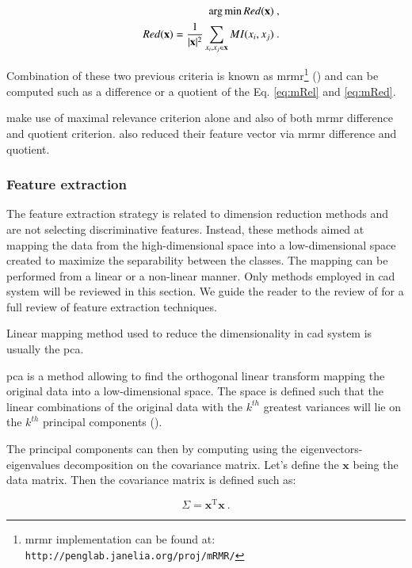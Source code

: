 \begin{eqnarray}
	&&\operatorname*{arg\,min} Red(\mathbf{x}) \ , \nonumber \\
	&& Red(\mathbf{x}) = \frac{1}{|\mathbf{x}|^2} \sum_{x_i,x_j \in \mathbf{x}} MI(x_i,x_j)  \ . \label{eq:mRed}
\end{eqnarray}

Combination of these two previous criteria is known as \ac{mrmr}\footnote{\ac{mrmr} implementation can be found at: \texttt{http://penglab.janelia.\allowbreak org/proj/mRMR/}} (\cite{Peng2005}) and can be computed such as a difference or a quotient of the Eq. \ref{eq:mRel} and \ref{eq:mRed}.

\cite{Niaf2011,Niaf2012} make use of maximal relevance criterion alone and also of both \ac{mrmr} difference and quotient criterion. \cite{Viswanath2012} also reduced their feature vector via \ac{mrmr} difference and quotient.

\subsubsection{Feature extraction}

The feature extraction strategy is related to dimension reduction methods and are not selecting discriminative features. Instead, these methods aimed at mapping the data from the high-dimensional space into a low-dimensional space created to maximize the separability between the classes. The mapping can be performed from a linear or a non-linear manner. Only methods employed in \ac{cad} system will be reviewed in this section. We guide the reader to the review of \cite{Fodor2002} for a full review of feature extraction techniques.

Linear mapping method used to reduce the dimensionality in \ac{cad} system is usually the \ac{pca}. 

\ac{pca} is a method allowing to find the orthogonal linear transform mapping the original data into a low-dimensional space. The space is defined such that the linear combinations of the original data with the $k^{th}$ greatest variances will lie on the $k^{th}$ principal components (\cite{Jolliffe2002}).

The principal components can then by computing using the eigenvectors-eigenvalues decomposition on the covariance matrix. Let's define the $\mathbf{x}$ being the data matrix. Then the covariance matrix is defined such as:

\begin{equation}
	\Sigma = \mathbf{x}^{\text{T}} \mathbf{x} \ .
	\label{eq:covmat}
\end{equation}

